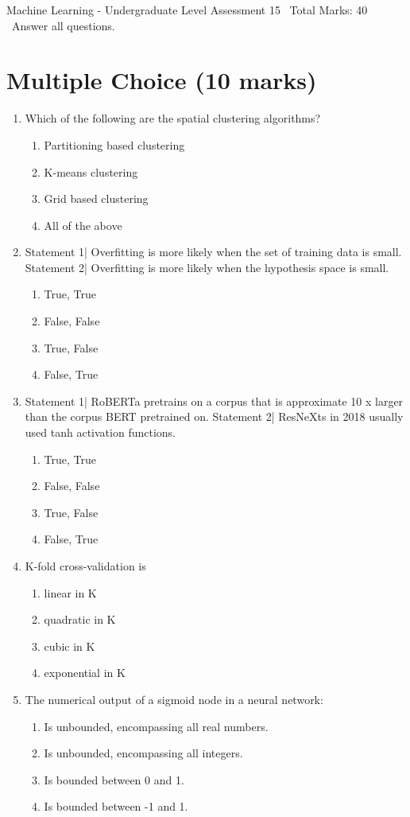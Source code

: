 \documentclass[12pt]{article}
\begin{document}
\begin{center}
Machine Learning - Undergraduate Level Assessment 15 \
Total Marks: 40 \
Answer all questions.
\end{center}

\section*{Multiple Choice (10 marks)}
\begin{enumerate}[label=\arabic*.]
\item Which of the following are the spatial clustering algorithms?
\begin{enumerate}[label=(\alph*)]
    \item Partitioning based clustering
    \item K-means clustering
    \item Grid based clustering
    \item All of the above
\end{enumerate}
\item Statement 1| Overfitting is more likely when the set of training data is small. Statement 2| Overfitting is more likely when the hypothesis space is small.
\begin{enumerate}[label=(\alph*)]
    \item True, True
    \item False, False
    \item True, False
    \item False, True
\end{enumerate}
\item Statement 1| RoBERTa pretrains on a corpus that is approximate 10 x larger than the corpus BERT pretrained on. Statement 2| ResNeXts in 2018 usually used tanh activation functions.
\begin{enumerate}[label=(\alph*)]
    \item True, True
    \item False, False
    \item True, False
    \item False, True
\end{enumerate}
\item K-fold cross-validation is
\begin{enumerate}[label=(\alph*)]
    \item linear in K
    \item quadratic in K
    \item cubic in K
    \item exponential in K
\end{enumerate}
\item The numerical output of a sigmoid node in a neural network:
\begin{enumerate}[label=(\alph*)]
    \item Is unbounded, encompassing all real numbers.
    \item Is unbounded, encompassing all integers.
    \item Is bounded between 0 and 1.
    \item Is bounded between -1 and 1.
\end{enumerate}
\end{enumerate}
\end{document}
